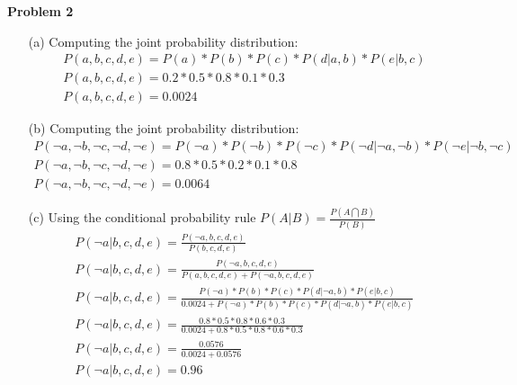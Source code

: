 \documentclass[11pt]{article}
\begin{document}
    \begin{center}
        \Large
        \textbf{Problem 2}
    \end{center}
    \normalsize
    \begin{enumerate}
        \item[(a)] Computing the joint probability distribution:
            \begin{gather*}
                P(a, b, c, d, e) = P(a)*P(b)*P(c)*P(d|a,b)*P(e|b,c)\\
                P(a, b, c, d, e) = 0.2*0.5*0.8*0.1*0.3\\
                P(a, b, c, d, e) = 0.0024
            \end{gather*}
        \item[(b)] Computing the joint probability distribution:
            \begin{gather*}
                P(\neg{a}, \neg{b}, \neg{c}, \neg{d}, \neg{e}) = P(\neg{a})*P(\neg{b})*P(\neg{c})*P(\neg{d}|\neg{a},\neg{b})*P(\neg{e}|\neg{b},\neg{c})\\
                P(\neg{a}, \neg{b}, \neg{c}, \neg{d}, \neg{e}) = 0.8*0.5*0.2*0.1*0.8\\
                P(\neg{a}, \neg{b}, \neg{c}, \neg{d}, \neg{e}) = 0.0064
            \end{gather*}
        \item[(c)] Using the conditional probability rule $P(A|B) = \frac{P(A\bigcap B)}{P(B)}$
            \begin{gather*}
                P(\neg{a} | b, c, d, e) = \frac{P(\neg{a}, b, c, d, e)}{P(b, c, d, e)}\\
                P(\neg{a} | b, c, d, e) = \frac{P(\neg{a}, b, c, d, e)}{P(a, b, c, d, e) + P(\neg{a}, b, c, d, e)}\\
                P(\neg{a} | b, c, d, e) = \frac{P(\neg{a})*P(b)*P(c)*P(d|\neg{a},b)*P(e|b,c)}{0.0024 + P(\neg{a})*P(b)*P(c)*P(d|\neg{a},b)*P(e|b,c)}\\
                P(\neg{a} | b, c, d, e) = \frac{0.8*0.5*0.8*0.6*0.3}{0.0024 + 0.8*0.5*0.8*0.6*0.3}\\
                P(\neg{a} | b, c, d, e) = \frac{0.0576}{0.0024 + 0.0576}\\
                P(\neg{a} | b, c, d, e) = 0.96
            \end{gather*}
    \end{enumerate}
\end{document}

